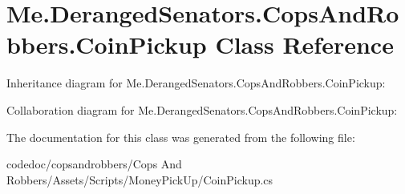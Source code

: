 \hypertarget{classMe_1_1DerangedSenators_1_1CopsAndRobbers_1_1CoinPickup}{}\section{Me.\+Deranged\+Senators.\+Cops\+And\+Robbers.\+Coin\+Pickup Class Reference}
\label{classMe_1_1DerangedSenators_1_1CopsAndRobbers_1_1CoinPickup}


Inheritance diagram for Me.\+Deranged\+Senators.\+Cops\+And\+Robbers.\+Coin\+Pickup\+:


Collaboration diagram for Me.\+Deranged\+Senators.\+Cops\+And\+Robbers.\+Coin\+Pickup\+:


The documentation for this class was generated from the following file\+:\begin{DoxyCompactItemize}
\item 
codedoc/copsandrobbers/\+Cops And Robbers/\+Assets/\+Scripts/\+Money\+Pick\+Up/Coin\+Pickup.\+cs\end{DoxyCompactItemize}
